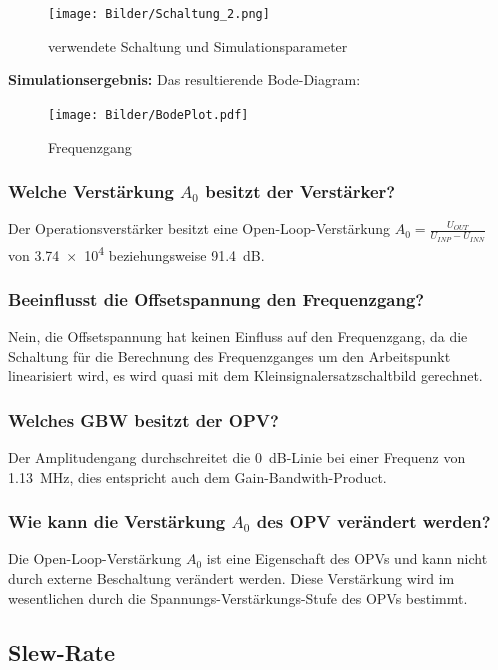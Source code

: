 \begin{figure}[H]
    \centering
    \texttt{[image: Bilder/Schaltung\_2.png]}
    \caption{verwendete Schaltung und Simulationsparameter}
    \label{fig:my_label}
\end{figure}

\textbf{Simulationsergebnis:} Das resultierende Bode-Diagram:
\begin{figure}[H]
    \centering
    \texttt{[image: Bilder/BodePlot.pdf]}
    \caption{Frequenzgang}
    \label{fig:my_label}
\end{figure}

\subsubsection{Welche Verstärkung $A_0$ besitzt der Verstärker?}

Der Operationsverstärker besitzt eine Open-Loop-Verstärkung $A_0 = \frac{U_{OUT}}{U_{INP}-U_{INN}}$ von \num{3.74e4} beziehungsweise \SI{91.4}{dB}.

\subsubsection{Beeinflusst die Offsetspannung den Frequenzgang?}

Nein, die Offsetspannung hat keinen Einfluss auf den Frequenzgang, da die Schaltung für die Berechnung des Frequenzganges um den Arbeitspunkt linearisiert wird, es wird quasi mit dem Kleinsignalersatzschaltbild gerechnet.

\subsubsection{Welches GBW besitzt der OPV?}

Der Amplitudengang durchschreitet die \SI{0}{dB}-Linie bei einer Frequenz von \SI{1.13}{\mega \hertz}, dies entspricht auch dem Gain-Bandwith-Product.

\subsubsection{Wie kann die Verstärkung $A_0$ des OPV verändert werden?}

Die Open-Loop-Verstärkung $A_0$ ist eine Eigenschaft des OPVs und kann nicht durch externe Beschaltung verändert werden. Diese Verstärkung wird im wesentlichen durch die Spannungs-Verstärkungs-Stufe des OPVs bestimmt.

\subsection{Slew-Rate}

